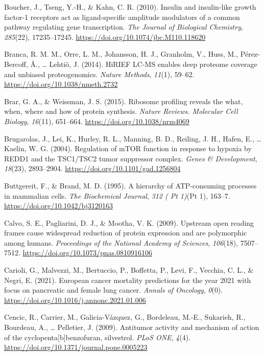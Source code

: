 \documentclass[12pt,openany]{book}
\begin{document}
\hypertarget{ref-Boucher2010}{}
Boucher, J., Tseng, Y.-H., \& Kahn, C. R. (2010). Insulin and
insulin-like growth factor-1 receptors act as ligand-specific amplitude
modulators of a common pathway regulating gene transcription. \emph{The
Journal of Biological Chemistry}, \emph{285}(22), 17235--17245.
\url{https://doi.org/10.1074/jbc.M110.118620}

\hypertarget{ref-Branca2014}{}
Branca, R. M. M., Orre, L. M., Johansson, H. J., Granholm, V., Huss, M.,
Pérez-Bercoff, Å., \ldots{} Lehtiö, J. (2014). HiRIEF LC-MS enables deep
proteome coverage and unbiased proteogenomics. \emph{Nature Methods},
\emph{11}(1), 59--62. \url{https://doi.org/10.1038/nmeth.2732}

\hypertarget{ref-Brar2015}{}
Brar, G. A., \& Weissman, J. S. (2015). Ribosome profiling reveals the
what, when, where and how of protein synthesis. \emph{Nature Reviews.
Molecular Cell Biology}, \emph{16}(11), 651--664.
\url{https://doi.org/10.1038/nrm4069}

\hypertarget{ref-Brugarolas2004}{}
Brugarolas, J., Lei, K., Hurley, R. L., Manning, B. D., Reiling, J. H.,
Hafen, E., \ldots{} Kaelin, W. G. (2004). Regulation of mTOR function in
response to hypoxia by REDD1 and the TSC1/TSC2 tumor suppressor complex.
\emph{Genes \& Development}, \emph{18}(23), 2893--2904.
\url{https://doi.org/10.1101/gad.1256804}

\hypertarget{ref-Buttgereit1995}{}
Buttgereit, F., \& Brand, M. D. (1995). A hierarchy of ATP-consuming
processes in mammalian cells. \emph{The Biochemical Journal}, \emph{312
( Pt 1)}(Pt 1), 163--7. \url{https://doi.org/10.1042/bj3120163}

\hypertarget{ref-Calvo2009}{}
Calvo, S. E., Pagliarini, D. J., \& Mootha, V. K. (2009). Upstream open
reading frames cause widespread reduction of protein expression and are
polymorphic among humans. \emph{Proceedings of the National Academy of
Sciences}, \emph{106}(18), 7507--7512.
\url{https://doi.org/10.1073/pnas.0810916106}

\hypertarget{ref-Carioli2021}{}
Carioli, G., Malvezzi, M., Bertuccio, P., Boffetta, P., Levi, F.,
Vecchia, C. L., \& Negri, E. (2021). European cancer mortality
predictions for the year 2021 with focus on pancreatic and female lung
cancer. \emph{Annals of Oncology}, \emph{0}(0).
\url{https://doi.org/10.1016/j.annonc.2021.01.006}

\hypertarget{ref-Cencic2009}{}
Cencic, R., Carrier, M., Galicia-Vázquez, G., Bordeleau, M.-E.,
Sukarieh, R., Bourdeau, A., \ldots{} Pelletier, J. (2009). Antitumor
activity and mechanism of action of the cyclopenta{[}b{]}benzofuran,
silvestrol. \emph{PLoS ONE}, \emph{4}(4).
\url{https://doi.org/10.1371/journal.pone.0005223}
\end{document}
